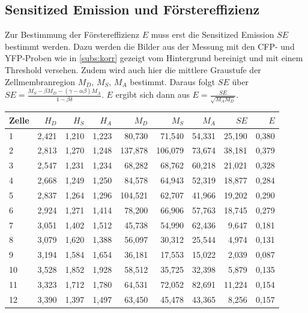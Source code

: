\subsection{Sensitized Emission und Förstereffizienz}
Zur Bestimmung der Förstereffizienz $E$ muss erst die Sensitized Emission $SE$ bestimmt werden. Dazu werden die Bilder aus der 
Messung mit den CFP- und YFP-Proben wie in \ref{subs:korr} gezeigt vom Hintergrund bereinigt und mit einem Threshold versehen. 
Zudem wird auch hier die mittlere Graustufe der Zellmembranregion $M_D$, $M_S$, $M_A$ bestimmt. Daraus folgt $SE$ über 
$SE = \frac{M_S - \beta M_D - (\gamma - \alpha \beta) M_A}{1 - \beta \delta}$. $E$ ergibt sich dann aus 
$E = \frac{SE}{\sqrt{M_A M_D}}$.


\begin{center}
    \centering
    \begin{tabular}{lrrrrrrrr}
        \toprule
        Zelle &  $H_D$ &  $H_S$ &  $H_A$ &    $M_D$ &    $M_S$ &   $M_A$ &     $SE$ &     $E$ \\
        \midrule
        1     & 2,421 & 1,210 & 1,223 &  80,730 &  71,540 & 54,331 & 25,190 & 0,380 \\
        2     & 2,813 & 1,270 & 1,248 & 137,878 & 106,079 & 73,674 & 38,181 & 0,379 \\
        3     & 2,547 & 1,231 & 1,234 &  68,282 &  68,762 & 60,218 & 21,021 & 0,328 \\
        4     & 2,668 & 1,249 & 1,250 &  84,578 &  64,943 & 52,319 & 18,877 & 0,284 \\
        5     & 2,837 & 1,264 & 1,296 & 104,521 &  62,707 & 41,966 & 19,202 & 0,290 \\
        6     & 2,924 & 1,271 & 1,414 &  78,200 &  66,906 & 57,763 & 18,745 & 0,279 \\
        7     & 3,051 & 1,402 & 1,512 &  45,738 &  54,990 & 62,436 &  9,647 & 0,181 \\
        8     & 3,079 & 1,620 & 1,388 &  56,097 &  30,312 & 25,544 &  4,974 & 0,131 \\
        9     & 3,194 & 1,584 & 1,654 &  36,181 &  17,553 & 15,022 &  2,039 & 0,087 \\
        10    & 3,528 & 1,852 & 1,928 &  58,512 &  35,725 & 32,398 &  5,879 & 0,135 \\
        11    & 3,323 & 1,712 & 1,780 &  64,531 &  72,052 & 82,691 & 11,224 & 0,154 \\
        12    & 3,390 & 1,397 & 1,497 &  63,450 &  45,478 & 43,365 &  8,256 & 0,157 \\

\end{tabular}
\end{center}

